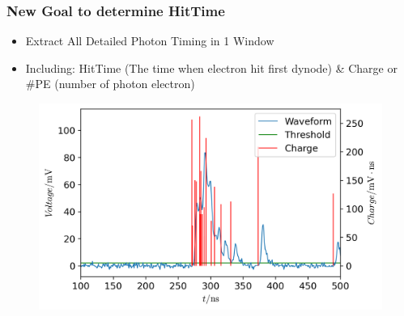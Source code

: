 \documentclass{beamer}
\begin{document}
\begin{frame}
\frametitle{New Goal to determine HitTime}
\begin{itemize}
    \item Extract All Detailed Photon Timing in 1 Window
    \item Including: HitTime (The time when electron hit first dynode) \& Charge or \#PE (number of photon electron)
\end{itemize}
\begin{figure}
    \centering
    \includegraphics[width=0.8\linewidth]{img/goal.png}
\end{figure}
\end{frame}
\end{document}
